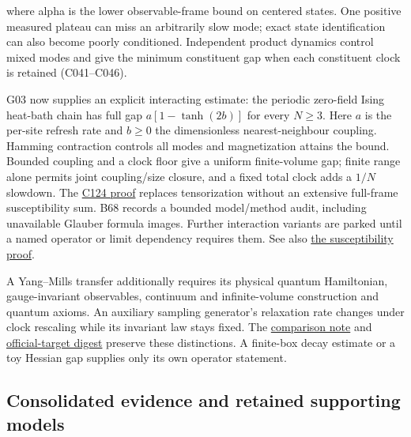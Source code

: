 \documentclass[11pt,a4paper]{article}
\begin{document}
where alpha is the lower observable-frame bound on centered states. One
positive measured plateau can miss an arbitrarily slow mode; exact state
identification can also become poorly conditioned. Independent product
dynamics control mixed modes and give the minimum constituent gap when
each constituent clock is retained (C041--C046).

G03 now supplies an explicit interacting estimate: the periodic
zero-field Ising heat-bath chain has full gap \(a[1-\tanh(2b)]\) for
every \(N\ge3\). Here \(a\) is the per-site refresh rate and \(b\ge0\)
the dimensionless nearest-neighbour coupling. Hamming contraction
controls all modes and magnetization attains the bound. Bounded coupling
and a clock floor give a uniform finite-volume gap; finite range alone
permits joint coupling/size closure, and a fixed total clock adds a
\(1/N\) slowdown. The \href{../notes/interacting-ising-gap.md}{C124
proof} replaces tensorization without an extensive full-frame
susceptibility sum. B68 records a bounded model/method audit, including
unavailable Glauber formula images. Further interaction variants are
parked until a named operator or limit dependency requires them. See
also \href{../notes/susceptibility-gap.md}{the susceptibility proof}.

A Yang--Mills transfer additionally requires its physical quantum
Hamiltonian, gauge-invariant observables, continuum and infinite-volume
construction and quantum axioms. An auxiliary sampling generator's
relaxation rate changes under clock rescaling while its invariant law
stays fixed. The \href{../notes/comparison-and-bridges.md}{comparison
note} and
\href{../notes/millennium-problem-definitions.md}{official-target
digest} preserve these distinctions. A finite-box decay estimate or a
toy Hessian gap supplies only its own operator statement.

\hypertarget{consolidated-evidence-and-retained-supporting-models}{%
\subsection{Consolidated evidence and retained supporting
models}\label{consolidated-evidence-and-retained-supporting-models}}
\end{document}
